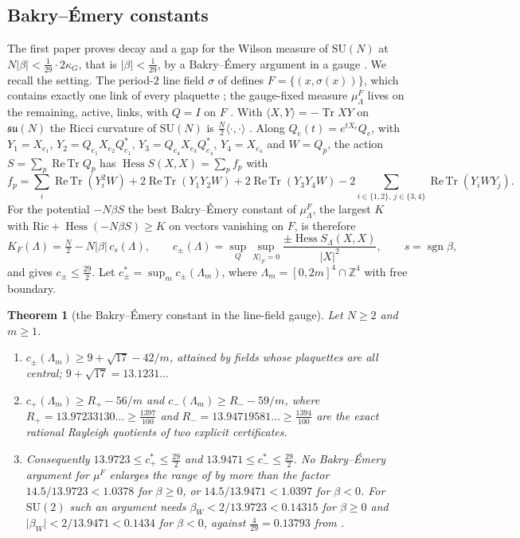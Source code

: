 \documentclass[11pt,a4paper]{amsart}
\newtheorem{theorem}{Theorem}[section]
\theoremstyle{definition}
\theoremstyle{remark}
\numberwithin{equation}{section}
\DeclareMathOperator{\Tr}{Tr}        %
\DeclareMathOperator{\ReTr}{Re\,Tr}  %
\DeclareMathOperator{\Hess}{Hess}    %
\newcommand{\Z}{\mathbb{Z}}          %
\newcommand{\ip}[2]{\langle #1,#2\rangle}  %
\newcommand{\abs}[1]{\lvert #1\rvert}      %
\newcommand{\SU}{\mathrm{SU}}              %
\newcommand{\betaW}{\beta_{W}}             %
\begin{document}
\subsection{Bakry--\'Emery constants}

The first paper proves decay and a gap for the Wilson measure of $\SU(N)$ at $N\abs\beta<\frac1{29}\cdot2\kappa_G$, that is $\abs\beta<\frac1{29}$, by a Bakry--\'Emery argument \cite{bakry1985} in a gauge \cite[Theorems~1 and~A]{bhattacharjee2026first}. We recall the setting. The period-$2$ line field $\sigma$ of \cite[Section~3 and Table~A1]{bhattacharjee2026first} defines $F=\{(x,\sigma(x))\}$, which contains exactly one link of every plaquette \cite[Lemma~2]{bhattacharjee2026first}; the gauge-fixed measure $\mu^F_\Lambda$ lives on the remaining, active, links, with $Q=I$ on $F$ \cite[Lemma~3]{bhattacharjee2026first}. With $\ip XY=-\Tr XY$ on $\mathfrak{su}(N)$ the Ricci curvature of $\SU(N)$ is $\frac N2\ip\cdot\cdot$ \cite[Lemma~7]{bhattacharjee2026first}. Along $Q_e(t)=e^{tX_e}Q_e$, with $Y_1=X_{e_1}$, $Y_2=Q_{e_1}X_{e_2}Q_{e_1}^*$, $Y_3=Q_{e_4}X_{e_3}Q_{e_4}^*$, $Y_4=X_{e_4}$ and $W=Q_p$, the action $S=\sum_p\ReTr Q_p$ has $\Hess S(X,X)=\sum_pf_p$ with
\begin{equation}\label{eq:BE-fp}
f_p=\sum_i\ReTr(Y_i^2W)+2\ReTr(Y_1Y_2W)+2\ReTr(Y_3Y_4W)-2\sum_{i\in\{1,2\},\,j\in\{3,4\}}\ReTr(Y_iWY_j).
\end{equation}
For the potential $-N\beta S$ the best Bakry--\'Emery constant of $\mu^F_\Lambda$, the largest $K$ with $\mathrm{Ric}+\Hess(-N\beta S)\ge K$ on vectors vanishing on $F$, is therefore
\[
K_F(\Lambda)=\tfrac N2-N\abs\beta\,c_s(\Lambda),\qquad c_\pm(\Lambda)=\sup_Q\sup_{X|_F=0}\frac{\pm\Hess S_\Lambda(X,X)}{\abs X^2},\qquad s=\operatorname{sgn}\beta,
\]
and \cite[Theorem~1]{bhattacharjee2026first} gives $c_\pm\le\frac{29}2$. Let $c^*_\pm=\sup_mc_\pm(\Lambda_m)$, where $\Lambda_m=[0,2m]^4\cap\Z^4$ with free boundary.

\begin{theorem}[the Bakry--\'Emery constant in the line-field gauge]\label{thm:BE-line-field}
Let $N\ge2$ and $m\ge1$.
\begin{enumerate}[label=\textup{(\alph*)},leftmargin=*]
\item $c_\pm(\Lambda_m)\ge9+\sqrt{17}-42/m$, attained by fields whose plaquettes are all central; $9+\sqrt{17}=13.1231\ldots$
\item $c_+(\Lambda_m)\ge R_+-56/m$ and $c_-(\Lambda_m)\ge R_--59/m$, where $R_+=13.97233130\ldots\ge\frac{1397}{100}$ and $R_-=13.94719581\ldots\ge\frac{1394}{100}$ are the exact rational Rayleigh quotients of two explicit certificates.
\item Consequently $13.9723\le c^*_+\le\frac{29}2$ and $13.9471\le c^*_-\le\frac{29}2$. No Bakry--\'Emery argument for $\mu^F$ enlarges the range of \cite[Theorem~A]{bhattacharjee2026first} by more than the factor $14.5/13.9723<1.0378$ for $\beta\ge0$, or $14.5/13.9471<1.0397$ for $\beta<0$. For $\SU(2)$ such an argument needs $\betaW<2/13.9723<0.14315$ for $\beta\ge0$ and $\abs\betaW<2/13.9471<0.1434$ for $\beta<0$, against $\frac4{29}=0.13793$ from \cite[Theorem~A]{bhattacharjee2026first}.
\end{enumerate}
\end{theorem}
\end{document}

